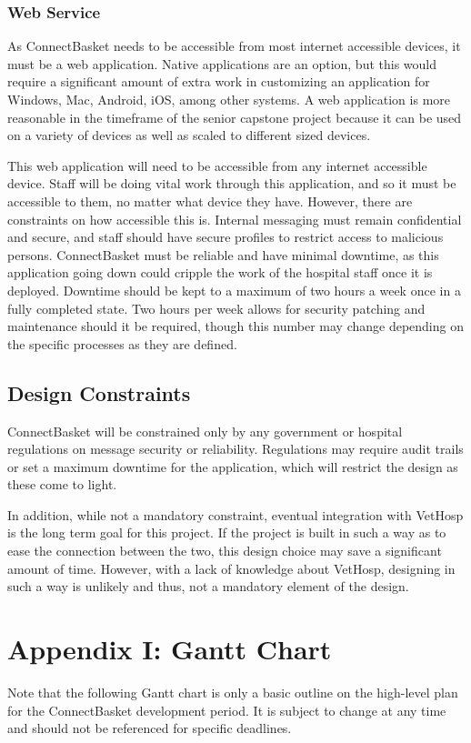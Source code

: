 \documentclass[onecolumn, draftclsnofoot,10pt, compsoc]{IEEEtran}
\begin{document}
\subsubsection{Web Service}
As ConnectBasket needs to be accessible from most internet accessible devices, it must be a web application. Native applications are an option, but this would require a significant amount of extra work in customizing an application for Windows, Mac, Android, iOS, among other systems. A web application is more reasonable in the timeframe of the senior capstone project because it can be used on a variety of devices as well as scaled to different sized devices.

This web application will need to be accessible from any internet accessible device. Staff will be doing vital work through this application, and so it must be accessible to them, no matter what device they have. However, there are constraints on how accessible this is. Internal messaging must remain confidential and secure, and staff should have secure profiles to restrict access to malicious persons. ConnectBasket must be reliable and have minimal downtime, as this application going down could cripple the work of the hospital staff once it is deployed. Downtime should be kept to a maximum of two hours a week once in a fully completed state. Two hours per week allows for security patching and maintenance should it be required, though this number may change depending on the specific processes as they are defined.

\subsection{Design Constraints}
ConnectBasket will be constrained only by any government or hospital regulations on message security or reliability. Regulations may require audit trails or set a maximum downtime for the application, which will restrict the design as these come to light.

In addition, while not a mandatory constraint, eventual integration with VetHosp is the long term goal for this project. If the project is built in such a way as to ease the connection between the two, this design choice may save a significant amount of time. However, with a lack of knowledge about VetHosp, designing in such a way is unlikely and thus, not a mandatory element of the design.
\section{Appendix I: Gantt Chart}
Note that the following Gantt chart is only a basic outline on the high-level plan for the ConnectBasket development period. It is subject to change at any time and should not be referenced for specific deadlines.
\end{document}

